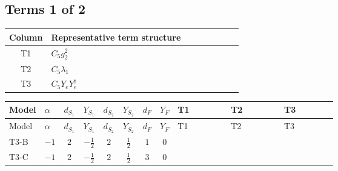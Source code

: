 \documentclass[8pt]{article}
\begin{document}
\begin{landscape}
\subsection*{Terms 1 of 2}
\begin{center}
\begin{tabular}{@{}c >{\raggedright\arraybackslash}p{0.82\linewidth}@{}}
\toprule
Column & Representative term structure \\
\midrule
T1 & \(\displaystyle C_{5} g_{2}^{2}\) \\
\midrule
T2 & \(\displaystyle C_{5} \lambda_1\) \\
\midrule
T3 & \(\displaystyle C_{5} Y_e Y_e^\dagger\) \\
\midrule
\bottomrule
\end{tabular}
\end{center}
\smallskip
\tiny
\begin{longtable}{@{}llcccccc >{\raggedright\arraybackslash}p{0.21\linewidth} >{\raggedright\arraybackslash}p{0.21\linewidth} >{\raggedright\arraybackslash}p{0.21\linewidth}@{}}
\toprule
Model & $\alpha$ & $d_{S_1}$ & $Y_{S_1}$ & $d_{S_2}$ & $Y_{S_2}$ & $d_F$ & $Y_F$ & T1 & T2 & T3 \\
\midrule
\endfirsthead
\toprule
Model & $\alpha$ & $d_{S_1}$ & $Y_{S_1}$ & $d_{S_2}$ & $Y_{S_2}$ & $d_F$ & $Y_F$ & T1 & T2 & T3 \\
\midrule
\endhead
T3-B & $-1$ & $2$ & $-\frac{1}{2}$ & $2$ & $\frac{1}{2}$ & $1$ & $0$ & \scriptsize\adjustbox{max width=\linewidth}{$\begin{gathered} - 3 C_{5} g_{2}^{2}\end{gathered}$} & \scriptsize\adjustbox{max width=\linewidth}{$\begin{gathered} 2 C_{5} \lambda_1\end{gathered}$} & \scriptsize\adjustbox{max width=\linewidth}{$\begin{gathered} - C_{5} Y_e Y_e^\dagger\end{gathered}$} \\
\midrule
T3-C & $-1$ & $2$ & $-\frac{1}{2}$ & $2$ & $\frac{1}{2}$ & $3$ & $0$ & \scriptsize\adjustbox{max width=\linewidth}{$\begin{gathered} - 3 C_{5} g_{2}^{2}\end{gathered}$} & \scriptsize\adjustbox{max width=\linewidth}{$\begin{gathered} 2 C_{5} \lambda_1\end{gathered}$} & \scriptsize\adjustbox{max width=\linewidth}{$\begin{gathered} - C_{5} Y_e Y_e^\dagger\end{gathered}$} \\

\end{longtable}
\end{landscape}
\end{document}
